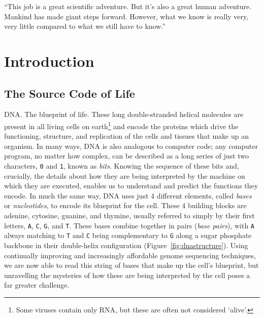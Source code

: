 \cleartorightpage
\begin{savequote}[75mm]
``This job is a great scientific adventure. But it's also a great human adventure. Mankind has made giant steps forward. However, what we know is really very, very little compared to what we still have to know.''
\end{savequote}


\chapter{Introduction}\label{introduction}
\setcounter{figure}{-1}
\setcounter{table}{-1}
\setcounter{section}{-1}
\setcounter{NAT@ctr}{-1}

\setlength\parindent{0pt}

\begin{justify}

\section{The Source Code of Life}

DNA\@. The blueprint of life. These long double-stranded helical molecules are present in all living cells on earth\footnote{Some viruses contain only RNA, but these are often not considered `alive'.} and encode the proteins which drive the functioning, structure, and replication of the cells and tissues that make up an organism. In many ways, DNA is also analogous to computer code; any computer program, no matter how complex, can be described as a long series of just two characters, \verb+0+ and \verb+1+, known as \emph{bits}. Knowing the sequence of these bits and, crucially, the details about how they are being interpreted by the machine on which they are executed, enables us to understand and predict the functions they encode. In much the same way, DNA uses just 4 different elements, called \emph{bases} or \emph{nucleotides}, to encode its blueprint for the cell. These 4 building blocks are adenine, cytosine, guanine, and thymine, usually referred to simply by their first letters, \verb+A+, \verb+C+, \verb+G+, and \verb+T+. These bases combine together in pairs (\emph{base pairs}), with \verb+A+ always matching to \verb+T+ and \verb+C+ being complementary to \verb+G+ along a sugar phosphate backbone in their double-helix configuration (Figure~\ref{fig:dnastructure}). Using continually improving and increasingly affordable genome sequencing techniques, we are now able to read this string of bases that make up the cell's blueprint, but unravelling the mysteries of how these are being interpreted by the cell poses a far greater challenge.

\end{justify}


